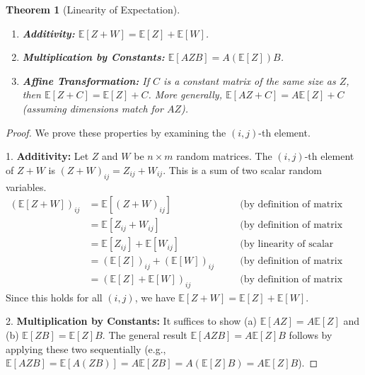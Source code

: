 \documentclass[11pt]{article}
\newtheorem{theorem}{Theorem}[section]
\theoremstyle{definition}
\newcommand{\E}{\mathbb{E}}
\begin{document}
\begin{theorem}[Linearity of Expectation]
\begin{enumerate}
    \item \textbf{Additivity:} $\E[Z + W] = \E[Z] + \E[W]$.
    \item \textbf{Multiplication by Constants:} $\E[A Z B] = A (\E[Z]) B$.
    \item \textbf{Affine Transformation:} If $C$ is a constant matrix of the same size as $Z$, then $\E[Z + C] = \E[Z] + C$. More generally, $\E[A Z + C] = A \E[Z] + C$ (assuming dimensions match for $A Z$).
\end{enumerate}
\end{theorem}

\begin{proof}
We prove these properties by examining the $(i,j)$-th element.

1.  \textbf{Additivity:}
    Let $Z$ and $W$ be $n \times m$ random matrices. The $(i,j)$-th element of $Z+W$ is $(Z+W)_{ij} = Z_{ij} + W_{ij}$. This is a sum of two scalar random variables.
    \begin{align*}
        (\E[Z + W])_{ij} &= \E[(Z + W)_{ij}] \quad &&\text{(by definition of matrix expectation)} \\
                         &= \E[Z_{ij} + W_{ij}] \quad &&\text{(by definition of matrix addition)} \\
                         &= \E[Z_{ij}] + \E[W_{ij}] \quad &&\text{(by linearity of scalar expectation)} \\
                         &= (\E[Z])_{ij} + (\E[W])_{ij} \quad &&\text{(by definition of matrix expectation)} \\
                         &= (\E[Z] + \E[W])_{ij} \quad &&\text{(by definition of matrix addition)}
    \end{align*}
    Since this holds for all $(i,j)$, we have $\E[Z + W] = \E[Z] + \E[W]$.

2.  \textbf{Multiplication by Constants:} It suffices to show (a) $\E[AZ] = A\E[Z]$ and (b) $\E[ZB] = \E[Z]B$. The general result $\E[AZB] = A\E[Z]B$ follows by applying these two sequentially (e.g., $\E[AZB] = \E[A(ZB)] = A\E[ZB] = A(\E[Z]B) = A\E[Z]B$).


\end{proof}
\end{document}
